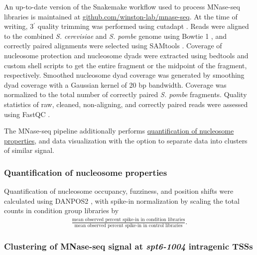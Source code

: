 An up-to-date version of the Snakemake \citep{koster2012} workflow used to process MNase-seq libraries is maintained at \href{https://github.com/winston-lab/mnase-seq}{github.com/winston-lab/mnase-seq}.
At the time of writing, 3$^\prime$ quality trimming was performed using cutadapt \citep{martin2011}.
Reads were aligned to the combined \textit{S. cerevisiae} and \textit{S. pombe} genome using Bowtie 1 \citep{langmead2009}, and correctly paired alignments were selected using SAMtools \citep{li2009}.
Coverage of nucleosome protection and nucleosome dyads were extracted using bedtools \citep{quinlan2010} and custom shell scripts to get the entire fragment or the midpoint of the fragment, respectively.
Smoothed nucleosome dyad coverage was generated by smoothing dyad coverage with a Gaussian kernel of 20 bp bandwidth.
Coverage was normalized to the total number of correctly paired \textit{S. pombe} fragments.
Quality statistics of raw, cleaned, non-aligning, and correctly paired reads were assessed using FastQC \citep{andrews2010}.

The MNase-seq pipeline additionally performs \hyperref[subsubsec:nucleosome_quantification]{quantification of nucleosome properties}, and data visualization with the option to separate data into clusters of similar signal.

\subsubsection{Quantification of nucleosome properties}
\label{subsubsec:nucleosome_quantification}
Quantification of nucleosome occupancy, fuzziness, and position shifts were calculated using DANPOS2 \citep{chen2013}, with spike-in normalization by scaling the total counts in condition group libraries by
\begin{align*}
    \frac{\text{mean observed percent spike-in in condition libraries}}{\text{mean observed percent spike-in in control libraries}}.
\end{align*}

\subsubsection{Clustering of MNase-seq signal at \textit{spt6-1004} intragenic TSSs}

